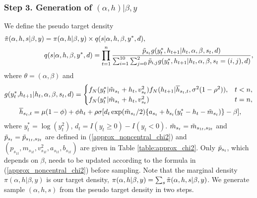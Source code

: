 \subsubsection*{Step 3. Generation of $(\alpha,h)|\beta,y$}
We define the pseudo target density
\begin{align*}
    \Tilde{\pi}(\alpha,h,s|\beta, y) &= \pi(\alpha,h|\beta,y) \times q(s|\alpha,h,\beta, y^*, d), \\
    &q(s|\alpha,h,\beta, y^*, d) = \prod_{t=1}^n \frac{\Tilde{p}_{s_t} g(y_t^*, h_{t+1}| h_t, \alpha,\beta, s_t, d)}{\sum_{i=1}^{10}\sum_{j=0}^2 \Tilde{p}_{i,j} g(y_t^*, h_{t+1}| h_t, \alpha,\beta, s_t=(i,j), d)}, 
\end{align*}
where $\theta=(\alpha,\beta)$ and
\begin{align*}
    g(y_t^*, &h_{t+1}| h_t, \alpha, \beta, s_t, d) = 
    \begin{cases}
        f_N(y_t^*|\Tilde{m}_{s_t} + h_t, v_{s_t}^2) f_N(h_{t+1}|\overline{h}_{s_t, t}, \sigma^2(1-\rho^2)), & t < n, \\
        f_N(y_t^*|\Tilde{m}_{s_t} + h_t, v_{s_t}^2) & t = n, 
    \end{cases} \\
    &\overline{h}_{s_t, t} = \mu(1-\phi) + \phi h_t +  \rho \sigma[d_t \exp(\Tilde{m}_{s_t}/2) \{ a_{s_t} + b_{s_t} (y_t^* - h_t - \Tilde{m}_{s_t})\} - \beta],
\end{align*}
where $y_t^* = \log(y_t^2)$, $d_t = I(y_t \geq 0) - I(y_t < 0)$.
$\Tilde{m}_{s_t} = \Tilde{m}_{s_{1t}, s_{2t}}$ and $\Tilde{p}_{s_t} = \Tilde{p}_{s_{1t}, s_{2t}}$ are defined in (\ref{approx_noncentral_chi2}) and $(p_{s_{1t}}, m_{s_{1t}}, v_{s_{1t}}^2, a_{s_{1t}}, b_{s_{1t}})$ are given in Table \ref{table:approx_chi2}.
Only $\Tilde{p}_{s_t}$, which depends on $\beta$, needs to be updated according to the formula in (\ref{approx_noncentral_chi2}) before sampling.
Note that the marginal density $\pi(\alpha,h|\beta,y)$ is our target density,  $\pi(\alpha,h|\beta,y) = \sum_s \Tilde{\pi}(\alpha,h,s|\beta,y)$. We generate sample $(\alpha, h, s)$ from the pseudo target density in two steps. 
